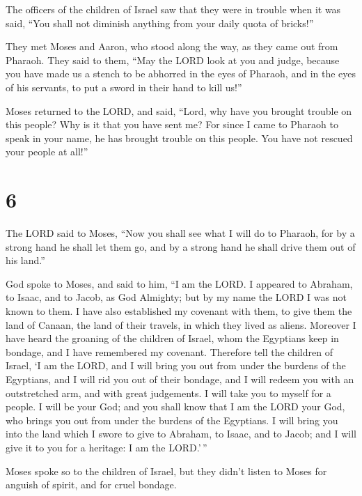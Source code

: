  The officers of the children of Israel saw that they were
in trouble when it was said, ``You shall not diminish anything from your
daily quota of bricks!''

 They met Moses and Aaron, who stood along the way, as they
came out from Pharaoh.  They said to them, ``May the LORD
look at you and judge, because you have made us a stench to be abhorred
in the eyes of Pharaoh, and in the eyes of his servants, to put a sword
in their hand to kill us!''

 Moses returned to the LORD, and said, ``Lord, why have you
brought trouble on this people? Why is it that you have sent me?
 For since I came to Pharaoh to speak in your name, he has
brought trouble on this people. You have not rescued your people at
all!''

\hypertarget{section-5}{%
\section{6}\label{section-5}}

 The LORD said to Moses, ``Now you shall see what I will do
to Pharaoh, for by a strong hand he shall let them go, and by a strong
hand he shall drive them out of his land.''

 God spoke to Moses, and said to him, ``I am the LORD.
 I appeared to Abraham, to Isaac, and to Jacob, as God
Almighty; but by my name the LORD I was not known to them. 
I have also established my covenant with them, to give them the land of
Canaan, the land of their travels, in which they lived as aliens.
 Moreover I have heard the groaning of the children of
Israel, whom the Egyptians keep in bondage, and I have remembered my
covenant.  Therefore tell the children of Israel, `I am the
LORD, and I will bring you out from under the burdens of the Egyptians,
and I will rid you out of their bondage, and I will redeem you with an
outstretched arm, and with great judgements.  I will take
you to myself for a people. I will be your God; and you shall know that
I am the LORD your God, who brings you out from under the burdens of the
Egyptians.  I will bring you into the land which I swore to
give to Abraham, to Isaac, and to Jacob; and I will give it to you for a
heritage: I am the LORD.'\,''

 Moses spoke so to the children of Israel, but they didn't
listen to Moses for anguish of spirit, and for cruel bondage.

